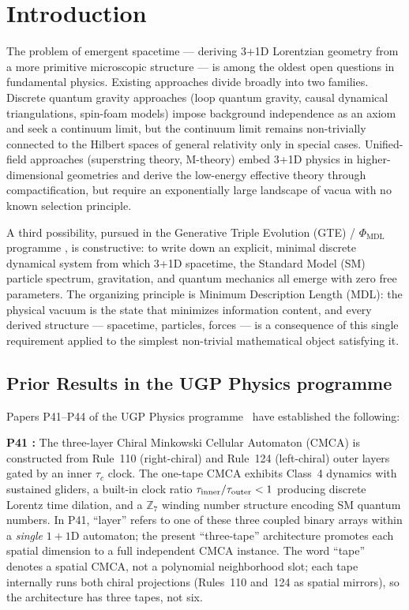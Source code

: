 \documentclass[11pt]{article}
\theoremstyle{remark}
\newcommand{\PHIMDL}{\Phi_{\mathrm{MDL}}}
\newcommand{\CMCA}{\text{CMCA}}
\newcommand{\tauc}{\tau_c}
\newcommand{\taucratio}{\tau_{\rm inner}/\tau_{\rm outer}}
\begin{document}
\section{Introduction}
\label{sec:intro}

The problem of emergent spacetime — deriving 3+1D Lorentzian geometry from a
more primitive microscopic structure — is among the oldest open questions in
fundamental physics. Existing approaches divide broadly into two families.
Discrete quantum gravity approaches (loop quantum gravity, causal dynamical
triangulations, spin-foam models) impose background independence as an axiom
and seek a continuum limit, but the continuum limit remains
non-trivially connected to the Hilbert spaces of general relativity only in
special cases. Unified-field approaches (superstring theory, M-theory)
embed 3+1D physics in higher-dimensional geometries and derive the low-energy
effective theory through compactification, but require an exponentially large
landscape of vacua with no known selection principle.

A third possibility, pursued in the Generative Triple Evolution (GTE)
/ $\PHIMDL$ programme \cite{SpivackCMCA,SpivackPhiMDLField,SpivackCompleteness},
is constructive: to write down an explicit, minimal discrete
dynamical system from which 3+1D spacetime, the Standard Model (SM)
particle spectrum, gravitation, and quantum mechanics all emerge with zero
free parameters. The organizing principle is Minimum Description Length (MDL):
the physical vacuum is the state that minimizes information content, and every
derived structure — spacetime, particles, forces — is a consequence of this
single requirement applied to the simplest non-trivial mathematical object
satisfying it.

\subsection{\texorpdfstring{Prior Results in the UGP Physics programme}{Prior Results in the UGP Physics programme}}

Papers P41--P44 of the UGP Physics programme~\cite{SpivackResearchProgrammes} have established the following:

\textbf{P41 \cite{SpivackCMCA}:} The three-layer Chiral Minkowski Cellular
Automaton ($\CMCA$) is constructed from Rule~110 (right-chiral) and Rule~124
(left-chiral) outer layers gated by an inner $\tauc$ clock. The one-tape
$\CMCA$ exhibits Class~4 dynamics with sustained gliders, a built-in clock
ratio $\taucratio < 1$ producing discrete Lorentz time dilation, and a
$\mathbb{Z}_7$ winding number structure encoding SM quantum numbers.
In P41, ``layer'' refers to one of these three coupled binary arrays within
a \emph{single} $1+1$D automaton; the present ``three-tape'' architecture
promotes each spatial dimension to a full independent CMCA instance.
The word ``tape'' denotes a spatial CMCA, not a polynomial neighborhood slot;
each tape internally runs both chiral projections (Rules~110 and~124 as
spatial mirrors), so the architecture has three tapes, not six.
\end{document}

